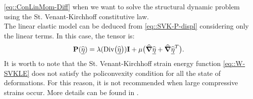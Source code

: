 \eqref{eq::ConLinMom-Diff} when we want to solve the structural
dynamic problem using the St. Venant-Kirchhoff constitutive law.\\ The
linear elastic model can be deduced from \eqref{eq::SVK-P-displ}
considering only the linear terms. In this case, the tensor \Piola is:
\begin{equation} \textbf{P}(\widehat{\underline{\eta}}) = \lambda(\text{Div}\big(\widehat{\underline{\eta}}\big))\textbf{I} +
  \mu\big(\widehat{\boldsymbol{\nabla}}\widehat{\underline{\eta}} + \widehat{\boldsymbol{\nabla}}\widehat{\underline{\eta}}^T\big).
  \label{eq::LE-P}
\end{equation} It is worth to note that the St. Venant-Kirchhoff
strain energy function \eqref{eq::W-SVKLE} does not satisfy the
policonvexity condition for all the state of deformations. For this
reason, it is not recommended when large compressive strains
occur. More details can be found in \cite{Hozapfel}.

